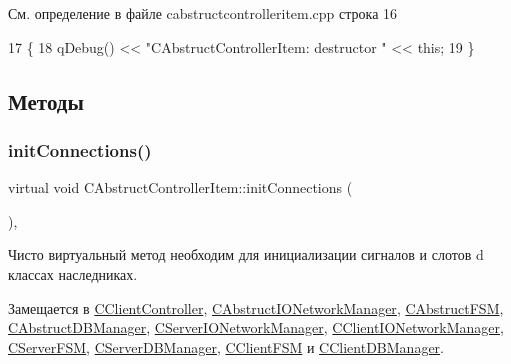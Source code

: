 См. определение в файле cabstructcontrolleritem.\+cpp строка 16


\begin{DoxyCode}
17 \{
18     qDebug() << \textcolor{stringliteral}{"CAbstructControllerItem: destructor "} << \textcolor{keyword}{this};
19 \}
\end{DoxyCode}


\subsection{Методы}
\hypertarget{class_c_abstruct_controller_item_a27c6889230a86cb0782e6d7596b883c1}{}\label{class_c_abstruct_controller_item_a27c6889230a86cb0782e6d7596b883c1} 
\subsubsection{\texorpdfstring{init\+Connections()}{initConnections()}}
{\footnotesize\ttfamily virtual void C\+Abstruct\+Controller\+Item\+::init\+Connections (\begin{DoxyParamCaption}{ }\end{DoxyParamCaption})\hspace{0.3cm}{\ttfamily [protected]}, {}}



Чисто виртуальный метод необходим для инициализации сигналов и слотов d классах наследниках. 



Замещается в \hyperlink{class_c_client_controller_a1dabfbc538daf66f1c2565808bc7db6d}{C\+Client\+Controller}, \hyperlink{class_c_abstruct_i_o_network_manager_ac01bfefacfa37050c8d3a9317a38fbf5}{C\+Abstruct\+I\+O\+Network\+Manager}, \hyperlink{class_c_abstruct_f_s_m_a9d6f4659a08f3028f8c047243f8dcfc3}{C\+Abstruct\+F\+SM}, \hyperlink{class_c_abstruct_d_b_manager_ad450c557df6d9a7dfcc4a37082f35659}{C\+Abstruct\+D\+B\+Manager}, \hyperlink{class_c_server_i_o_network_manager_a17155570c51dc951db52d827f120c689}{C\+Server\+I\+O\+Network\+Manager}, \hyperlink{class_c_client_i_o_network_manager_aeb1564c209ae8b790cf799075cfa6a98}{C\+Client\+I\+O\+Network\+Manager}, \hyperlink{class_c_server_f_s_m_ae0e6a994505c26e60b718af9989bea77}{C\+Server\+F\+SM}, \hyperlink{class_c_server_d_b_manager_a6dcd2f88c0845cc79a47bac2ab9e9235}{C\+Server\+D\+B\+Manager}, \hyperlink{class_c_client_f_s_m_aaf6b857e9a5d2b2f55b71212e74fd4cb}{C\+Client\+F\+SM} и \hyperlink{class_c_client_d_b_manager_a85d962d6f61d8f9480b6bc9a7f121204}{C\+Client\+D\+B\+Manager}.

